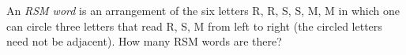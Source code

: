 An \emph{RSM word} is an arrangement of the six letters R, R, S, S, M, M in which one can circle three letters that read R, S, M from left to right (the circled letters need not be adjacent). How many RSM words are there?
